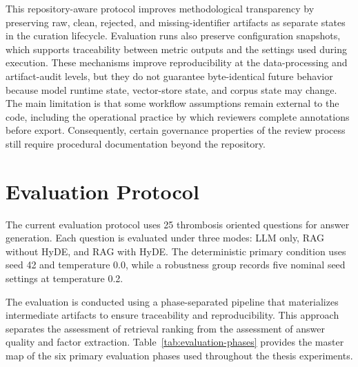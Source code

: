 This repository-aware protocol improves methodological transparency by preserving raw, clean, rejected, and missing-identifier artifacts as separate states in the curation lifecycle. Evaluation runs also preserve configuration snapshots, which supports traceability between metric outputs and the settings used during execution. These mechanisms improve reproducibility at the data-processing and artifact-audit levels, but they do not guarantee byte-identical future behavior because model runtime state, vector-store state, and corpus state may change. The main limitation is that some workflow assumptions remain external to the code, including the operational practice by which reviewers complete annotations before export. Consequently, certain governance properties of the review process still require procedural documentation beyond the repository.

\section{Evaluation Protocol}

The current evaluation protocol uses 25 thrombosis oriented questions for answer generation. Each question is evaluated under three modes: LLM only, RAG without HyDE, and RAG with HyDE. The deterministic primary condition uses seed 42 and temperature 0.0, while a robustness group records five nominal seed settings at temperature 0.2. 

The evaluation is conducted using a phase-separated pipeline that materializes intermediate artifacts to ensure traceability and reproducibility. This approach separates the assessment of retrieval ranking from the assessment of answer quality and factor extraction. Table~\ref{tab:evaluation-phases} provides the master map of the six primary evaluation phases used throughout the thesis experiments.


